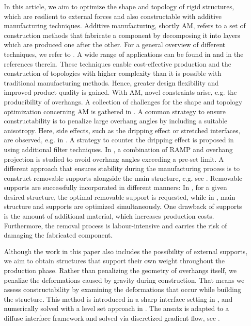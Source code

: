 \documentclass[a4paper,11pt]{article}
\theoremstyle{remark}
\begin{document}
In this article, we aim to optimize the shape and topology of rigid structures, which are resilient to external forces and also constructable with additive manufacturing techniques.
Additive manufacturing, shortly AM, refers to a set of construction methods that fabricate a component by decomposing it into layers which are produced one after the other.
For a general overview of different techniques, we refer to \cite{ReviewAM}.
A wide range of applications can be found in \cite{ReviewAMNgo} and in the references therein.
These techniques enable cost-effective production and the construction of topologies with higher complexity than it is possible with traditional manufacturing methods.
Hence, greater design flexibility and improved product quality is gained.
With AM, novel constraints arise, e.g. the producibility of overhangs.
A collection of challenges for the shape and topology optimization concerning AM is gathered in \cite{TrendsAM}.
A common strategy to ensure constructability is to penalize large overhang angles by including a suitable anisotropy. 
Here, side effects, such as the dripping effect or stretched interfaces, are observed, e.g. in \cite{AllaireOverview2,GLNS}.
A strategy to counter the dripping effect is proposed in \cite{PreventDripping} using additional filter techniques.
In \cite{gaynor2016topology}, a combination of RAMP and overhang projection is studied to avoid overhang angles exceeding a pre-set limit. 
A different approach that ensures stability during the manufacturing process is to construct removable supports alongside the main structure, e.g. see \cite{ReviewSupports}.
Removable supports are successfully incorporated in different manners:
In \cite{AllaireBogoselSupports1,Kuo2018support}, for a given desired structure, the optimal removable support is requested, while in \cite{AllaireBogoselSupports2,langelaar2018combined,MIRZENDEHDEL20161}, main structure and supports are optimized simultaneously.
One drawback of supports is the amount of additional material, which increases production costs.
Furthermore, the removal process is labour-intensive and carries the risk of damaging the fabricated component.

Although the work in this paper also includes the possibility of external supports, we aim to obtain structures that support their own weight throughout the production phase.
Rather than penalizing the geometry of overhangs itself, we penalize the deformations caused by gravity during construction.
That means
  we assess constructability by examining the
  deformations that occur while building the structure.
This method is introduced in a sharp interface setting in \cite{AllaireOverview1}, and numerically solved with a level set approach in \cite{AllaireOverview2}.
The ansatz is adapted to a diffuse interface framework and solved via discretized gradient flow, see \cite{WIAS}.
\end{document}
